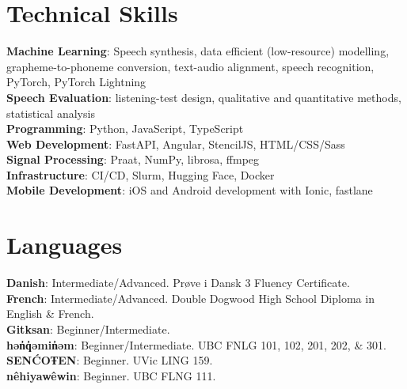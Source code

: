 \documentclass[letterpaper,11pt]{article}
\begin{document}
\section{Technical Skills}
 \begin{itemize}[leftmargin=0.15in, label={}]
    \small{\item{
     \textbf{Machine Learning}{: Speech synthesis, data efficient (low-resource) modelling, grapheme-to-phoneme conversion, text-audio alignment, speech recognition, PyTorch, PyTorch Lightning} \\
     \textbf{Speech Evaluation}{: listening-test design, qualitative and quantitative methods, statistical analysis} \\
     \textbf{Programming}{: Python, JavaScript, TypeScript} \\
     \textbf{Web Development}{: FastAPI, Angular, StencilJS, HTML/CSS/Sass} \\
     \textbf{Signal Processing}{: Praat, NumPy, librosa, ffmpeg} \\
     \textbf{Infrastructure}{: CI/CD, Slurm, Hugging Face, Docker} \\
     \textbf{Mobile Development}{: iOS and Android development with Ionic, fastlane}
    }}
 \end{itemize}

\section{Languages}
 \begin{itemize}[leftmargin=0.15in, label={}]
    \small{\item{
     \textbf{Danish}{: Intermediate/Advanced. Prøve i Dansk 3 Fluency Certificate.} \\
     \textbf{French}{: Intermediate/Advanced. Double Dogwood High School Diploma in English \& French.} \\
     \textbf{Gitksan}{: Beginner/Intermediate.} \\
     \textbf{hən̓q̓əmin̓əm}{: Beginner/Intermediate. UBC FNLG 101, 102, 201, 202, \& 301.} \\
     \textbf{SENĆOŦEN}{: Beginner. UVic LING 159.} \\
     \textbf{nêhiyawêwin}{: Beginner. UBC FLNG 111.}
    }}
 \end{itemize}

\end{document}
